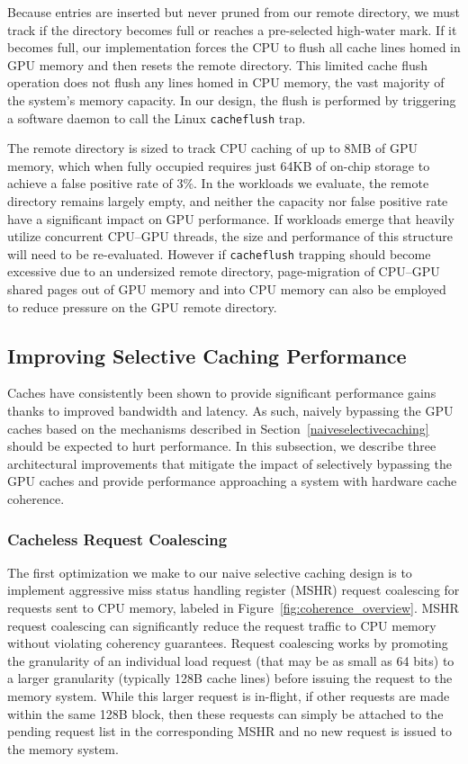 Because entries are inserted but never pruned from our remote directory, we must track if the directory
becomes full or reaches a pre-selected high-water mark.  If it becomes full, our implementation
forces the CPU to flush all cache lines homed in GPU memory and then resets the remote directory.  This limited
cache flush operation  does not flush any lines
homed in CPU memory, the vast majority of the system's memory capacity.  In our
design, the flush is performed by triggering a software daemon to call the Linux \texttt{cacheflush} trap.  

The remote directory is sized to track CPU caching of up to 8MB of GPU memory, which when fully occupied
requires just 64KB of on-chip storage to achieve a false positive rate of 3\%.  In the workloads we evaluate,
the remote directory remains largely empty, and neither the capacity nor false positive rate have a significant
impact on GPU performance.
If workloads emerge that 
heavily utilize concurrent CPU--GPU threads, the size and performance of this structure will need to be re-evaluated. 
However if \texttt{cacheflush} trapping should become excessive due to an undersized remote directory,
page-migration of CPU--GPU shared pages out of GPU memory and into CPU memory can also be employed to 
reduce pressure on the GPU remote directory.

\subsection{Improving Selective Caching Performance}
\label{microarchimprovements}

Caches have consistently been shown to provide significant performance 
gains thanks to improved bandwidth and latency.  As such, naively bypassing the GPU caches based on the mechanisms described in 
Section~\ref{naiveselectivecaching} should be expected to hurt performance. In this subsection, we describe 
three architectural improvements that mitigate the impact of selectively bypassing the GPU caches and provide performance approaching
a system with hardware cache coherence.

\subsubsection{Cacheless Request Coalescing}
\label{coalescing}

The first optimization we make to our naive
selective caching design is to implement aggressive miss status handling register (MSHR)
request coalescing for requests sent to CPU memory, labeled  in Figure~\ref{fig:coherence_overview}.  
MSHR request coalescing can significantly reduce the request traffic
to CPU memory without violating coherency guarantees.
Request coalescing works by promoting
the granularity of an individual load request (that may be as small as 64 bits)
to a larger granularity (typically 128B cache lines) before issuing the request
to the memory system.  While this larger request is in-flight, if other requests
are made within the same 128B block, then these requests
can simply be attached to the pending request list in the corresponding MSHR and no new request is issued
to the memory system.

